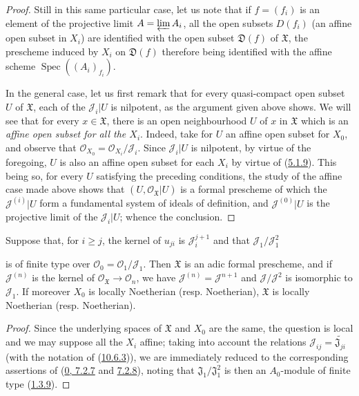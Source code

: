 \begin{proof}
Still in this same particular case, let us note that if $f=(f_i)$ is an
element of the projective limit $A=\varprojlim A_i$, all the open subsets
$D(f_i)$ (an affine open subset in $X_i$) are identified with the open
subset $\mathfrak{D}(f)$ of $\mathfrak{X}$, the prescheme induced by
$X_i$ on $\mathfrak{D}(f)$ therefore being identified with the affine
scheme $\operatorname{Spec}((A_i)_{f_i})$.

In the general case, let us first remark that for every quasi-compact
open subset $U$ of $\mathfrak{X}$, each of the $\mathscr{J}_i|U$ is
nilpotent, as the argument given above shows. We will see that for every
$x\in\mathfrak{X}$, there is an open neighbourhood $U$ of $x$ in
$\mathfrak{X}$ which is an \emph{affine open subset for all the $X_i$}.
Indeed, take for $U$ an affine open subset for $X_0$, and observe that
$\mathscr{O}_{X_0}=\mathscr{O}_{X_i}/\mathscr{J}_i$. Since
$\mathscr{J}_i|U$ is nilpotent, by virtue of the foregoing, $U$ is also
an affine open subset for each $X_i$ by virtue of
(\hyperref[I.5.1.9]{5.1.9}). This being so, for every $U$ satisfying
the preceding conditions, the study of the affine case made above shows
that $(U,\mathscr{O}_{\mathfrak{X}}|U)$ is a formal prescheme of which
the $\mathscr{J}^{(i)}|U$ form a fundamental system of ideals of
definition, and $\mathscr{J}^{(0)}|U$ is the projective limit of the
$\mathscr{J}_i|U$; whence the conclusion.
\end{proof}

\begin{corollary}[10.6.4]
\label{I.10.6.4}
Suppose that, for $i\geq j$, the kernel of $u_{ji}$ is
$\mathscr{J}_i^{j+1}$ and that $\mathscr{J}_1/\mathscr{J}_1^2$


is of finite type over
$\mathscr{O}_0=\mathscr{O}_1/\mathscr{J}_1$. Then $\mathfrak{X}$ is
an adic formal prescheme, and if $\mathscr{J}^{(n)}$ is the kernel of
$\mathscr{O}_{\mathfrak{X}}\to\mathscr{O}_n$, we have
$\mathscr{J}^{(n)}=\mathscr{J}^{n+1}$ and
$\mathscr{J}/\mathscr{J}^2$ is isomorphic to $\mathscr{J}_1$. If
moreover $X_0$ is locally Noetherian (resp. Noetherian),
$\mathfrak{X}$ is locally Noetherian (resp. Noetherian).
\end{corollary}

\begin{proof}
Since the underlying spaces of $\mathfrak{X}$ and $X_0$ are the same,
the question is local and we may suppose all the $X_i$ affine;
taking into account the relations
$\mathscr{J}_{ij}=\widetilde{\mathfrak{J}_{ji}}$ (with the notation
of (\hyperref[I.10.6.3]{10.6.3})), we are immediately reduced to the
corresponding assertions of
(\hyperref[0.7.2.7]{0, 7.2.7} and
\hyperref[0.7.2.8]{7.2.8}), noting that
$\mathfrak{J}_1/\mathfrak{J}_1^2$ is then an $A_0$-module of finite
type (\hyperref[I.1.3.9]{1.3.9}).
\end{proof}

